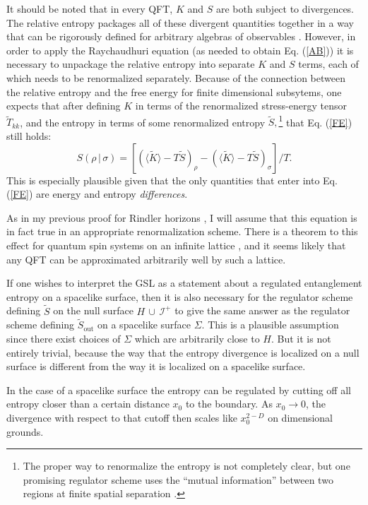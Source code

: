 \documentclass[12pt]{article}
\begin{document}
It should be noted that in every QFT, $K$ and $S$ are both subject to divergences.  The relative entropy packages all of these divergent quantities together in a way that can be rigorously defined for arbitrary algebras of observables \cite{araki75}.  However, in order to apply the Raychaudhuri equation (as needed to obtain Eq. (\ref{AB})) it is necessary to unpackage the relative entropy into separate $K$ and $S$ terms, each of which needs to be renormalized separately.  Because of the connection between the relative entropy and the free energy for finite dimensional subsytems, one expects that after defining $K$ in terms of the renormalized stress-energy tensor $\tilde{T}_{kk}$, and the entropy in terms of some renormalized entropy $\tilde{S},$\footnote{The proper way to renormalize the entropy is not completely clear, but one promising regulator scheme uses the ``mutual information'' between two regions at finite spatial separation \cite{casini06}.} that Eq. (\ref{FE}) still holds:
\begin{equation}
S(\rho\,|\,\sigma) = [(\langle \tilde{K} \rangle - T\tilde{S})_\rho -
(\langle \tilde{K} \rangle - T \tilde{S})_\sigma]/T.
\end{equation}
This is especially plausible given that the only quantities that enter into Eq. (\ref{FE}) are energy and entropy \emph{differences}.

As in my previous proof for Rindler horizons \cite{rindler}, I will assume that this equation is in fact true in an appropriate renormalization scheme.  There is a theorem to this effect for quantum spin systems on an infinite lattice \cite{AS77}, and it seems likely that any QFT can be approximated arbitrarily well by such a lattice.

If one wishes to interpret the GSL as a statement about a regulated entanglement entropy on a spacelike surface, then it is also necessary for the regulator scheme defining $\tilde{S}$ on the null surface $H\,\cup\,\mathcal{I}^+$ to give the same answer as the regulator scheme defining $\tilde{S}_\mathrm{out}$ on a spacelike surface $\Sigma$.  This is a plausible assumption since there exist choices of $\Sigma$ which are arbitrarily close to $H$.  But it is not entirely trivial, because the way that the entropy divergence is localized on a null surface is different from the way it is localized on a spacelike surface.

In the case of a spacelike surface the entropy can be regulated by cutting off all entropy closer than a certain distance $x_0$ to the boundary.  As $x_0 \to 0$, the divergence with respect to that cutoff then scales like $x_0^{2-D}$ on dimensional grounds.
\end{document}
